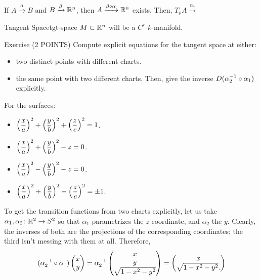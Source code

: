 \documentclass{article}
\begin{document}
If $A \xrightarrow{\alpha} B$ and $B \xrightarrow{\beta} \RR[n]$,
then $A \xrightarrow{\beta \circ \alpha} \RR[n]$ exists.
Then, $T_{p}A \xrightarrow{\alpha_{*}}$

\begin{definition}{Tangent Space}{tgt-space}
  $M \subset \RR[n]$ will be a $C^{r}$ $k$-manifold.
\end{definition}

\begin{example}{Exercise (2 POINTS)}{}
  Compute explicit equations for the tangent space at either:
  \begin{itemize}
    \item two distinct points with different charts.
    \item the same point with two different charts.
          Then, give the inverse $D(\alpha_{2}\inv \circ \alpha_{1})$ explicitly.
  \end{itemize}

  For the surfaces:
  \begin{itemize}
    \item $\displaystyle \pars*{\frac{x}{a}}^{2} + \pars*{\frac{y}{b}}^{2} + \pars*{\frac{z}{c}}^{2} = 1$.
    \item $\displaystyle \pars*{\frac{x}{a}}^{2} + \pars*{\frac{y}{b}}^{2} - z = 0$.
    \item $\displaystyle \pars*{\frac{x}{a}}^{2} - \pars*{\frac{y}{b}}^{2} - z = 0$.
    \item $\displaystyle \pars*{\frac{x}{a}}^{2} + \pars*{\frac{y}{b}}^{2} - \pars*{\frac{z}{c}}^{2} = \pm 1$.
  \end{itemize}
\end{example}

To get the transition functions from two charts explicitly, let us take $\alpha_{1}, \alpha_{2} \from \RR[2] \to S^{2}$ so that $\alpha_{1}$ parametrizes the $z$ coordinate, and $\alpha_{2}$ the $y$.
Clearly, the inverses of both are the projections of the corresponding coordinates; the third isn't messing with them at all.
Therefore,
\[ (\alpha_{2}\inv \circ \alpha_{1}) \begin{pmatrix} x \\ y \end{pmatrix}
  = \alpha_{2}\inv \begin{pmatrix} x \\ y \\ \sqrt{1 - x^{2} - y^{2}} \end{pmatrix}
  = \begin{pmatrix} x \\ \sqrt{1 - x^{2} - y^{2}}. \end{pmatrix}
\]
\end{document}
